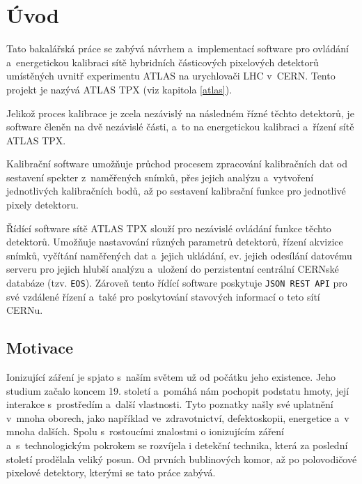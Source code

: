 

\chapter{Úvod}\label{chap01}
Tato bakalářská práce se zabývá návrhem a~implementací software pro ovládání a~energetickou kalibraci sítě hybridních částicových pixelových detektorů umístěných uvnitř experimentu ATLAS na urychlovači LHC v~CERN. Tento projekt je nazývá ATLAS TPX (viz kapitola \ref{atlas}).

Jelikož proces kalibrace je zcela nezávislý na následném řízné těchto detektorů, je software členěn na dvě nezávislé části, a~to na energetickou kalibraci a~řízení sítě  ATLAS TPX.

Kalibrační software umožňuje průchod procesem zpracování kalibračních dat od sestavení spekter z~naměřených snímků, přes jejich analýzu a~vytvoření jednotlivých kalibračních bodů, až po sestavení kalibrační funkce pro jednotlivé pixely detektoru.

Řídící software sítě ATLAS TPX slouží pro nezávislé ovládání funkce těchto detektorů. Umožňuje nastavování různých parametrů detektorů, řízení akvizice snímků, vyčítání naměřených dat a~jejich ukládání, ev. jejich odesílání datovému serveru pro jejich hlubší analýzu a~uložení do perzistentní centrální CERNské databáze (tzv. \texttt{EOS}). Zároveň tento řídící software poskytuje \texttt{JSON REST API} pro své vzdálené řízení a~také pro poskytování stavových informací o teto sítí CERNu.


\section{Motivace}
Ionizující záření je spjato s~naším světem už od počátku jeho existence. Jeho studium začalo koncem 19. století a~pomáhá nám pochopit podstatu hmoty, její interakce s~prostředím a~další vlastnosti. Tyto poznatky našly své uplatnění v~mnoha oborech, jako například ve~zdravotnictví, defektoskopii, energetice a~v mnoha dalších. Spolu s~rostoucími znalostmi o ionizujícím záření a~s~technologickým pokrokem se rozvíjela i detekční technika, která za poslední století prodělala veliký posun. Od prvních bublinových komor, až po polovodičové pixelové detektory, kterými se tato práce zabývá. 
	
